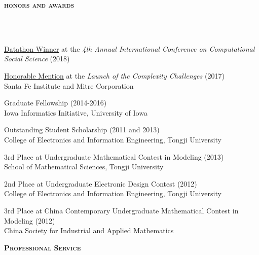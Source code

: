 \documentclass{article}
\newcommand{\header}[1]{{
\hspace*{-15pt}\vspace*{6pt} \textbf{\textsc{\large{#1}}}} \vspace*{-6pt} 
\lineunder
}
\newcommand{\lineunder}{
\vspace*{-8pt} \\ \hspace*{-15pt} 
\hrulefill \\
}
\renewcommand{\labelitemii}{
$\vcenter{\hbox{\tiny$\bullet$}}$\hspace*{-3pt}
}
\newenvironment{bullet-list-major}{
\begin{list}{\labelitemii}{\setlength\leftmargin{3pt} 
\topsep 0pt \itemsep -2pt}}{\vspace*{4pt}\end{list}
}
\begin{document}
\vspace*{4pt}
\header{honors and awards}
\begin{bullet-list-major}
    \item \href{https://github.com/zhiyzuo/ic2s2_datathon/blob/master/datathon.pdf}{Datathon Winner} at the \textit{4th Annual International Conference on Computational Social Science} (2018)
    \item \href{https://bitbucket.org/zhiyzuo/complexity-challenge/src/master/}{Honorable Mention} at the \textit{Launch of the Complexity Challenges} (2017) \\
    Santa Fe Institute and Mitre Corporation
    \item Graduate Fellowship (2014-2016) \\
    Iowa Informatics Initiative, University of Iowa
    \item Outstanding Student Scholarship (2011 and 2013) \\
    College  of  Electronics  and  Information  Engineering, Tongji  University
    \item 3rd Place at Undergraduate Mathematical Contest in Modeling (2013) \\
    School of Mathematical Sciences, Tongji University
    \item 2nd Place at Undergraduate Electronic Design Contest (2012) \\
    College of Electronics and Information Engineering, Tongji University
    \item 3rd Place at China Contemporary Undergraduate Mathematical Contest in Modeling (2012) \\
    China Society for Industrial and Applied Mathematics
\end{bullet-list-major}

\vspace*{4pt}
\header{Professional Service}
\end{document}
